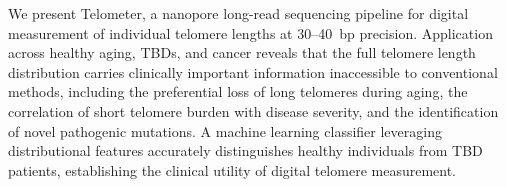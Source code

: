 \documentclass[11pt]{article}
\begin{document}
We present Telometer, a nanopore long-read sequencing pipeline for digital measurement of individual telomere lengths at 30--40~bp precision. Application across healthy aging, TBDs, and cancer reveals that the full telomere length distribution carries clinically important information inaccessible to conventional methods, including the preferential loss of long telomeres during aging, the correlation of short telomere burden with disease severity, and the identification of novel pathogenic mutations. A machine learning classifier leveraging distributional features accurately distinguishes healthy individuals from TBD patients, establishing the clinical utility of digital telomere measurement.



\end{document}

